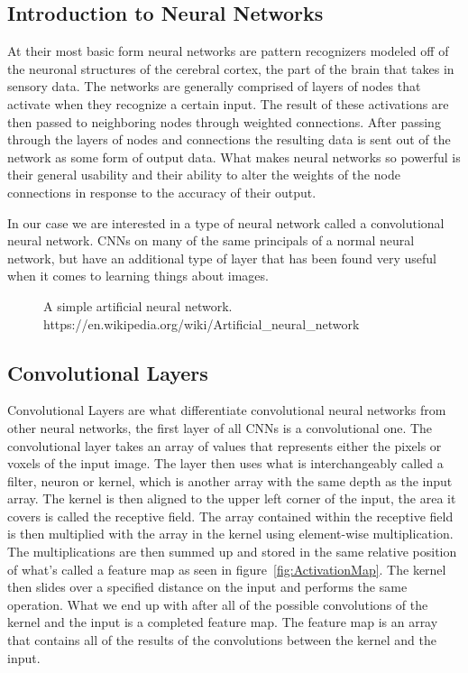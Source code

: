 \documentclass{sig-alternate}
\begin{document}
\subsection{Introduction to Neural Networks}
\label{sec:introNeuralNetworks}

At their most basic form neural networks are pattern recognizers modeled off of the neuronal structures of the cerebral cortex, the part of the brain that takes in sensory data. The networks are generally comprised of layers of nodes that activate when they recognize a certain input. The result of these activations are then passed to neighboring nodes through weighted connections. After passing   through the layers of nodes and connections the resulting data is sent out of the network as some form of output data. What makes neural networks so powerful is their general usability and their ability to alter the weights of the node connections in response to the accuracy of their output.

In our case we are interested in a type of neural network called a convolutional neural network. CNNs on many of the same principals of a normal neural network, but have an additional type of layer that has been found very useful when it comes to learning things about images.

\begin{figure}
\centering
{}
\caption{A simple artificial neural network. https://en.wikipedia.org/wiki/Artificial\_neural\_network}
\label{fig:ANN}
\end{figure}

\subsection{Convolutional Layers}
\label{sec:convolutionalLayers}

Convolutional Layers are what differentiate convolutional neural networks from other neural networks, the first layer of all CNNs is a convolutional one. The convolutional layer takes an array of values that represents either the pixels or voxels of the input image. The layer then uses what is interchangeably called a filter, neuron or kernel, which is another array with the same depth as the input array. The kernel is then aligned to the upper left corner of the input, the area it covers is called the receptive field. The array contained within the receptive field is then multiplied with the array in the kernel using element-wise multiplication. The multiplications are then summed up and stored in the same relative position of what's called a feature map as seen in figure~\ref{fig:ActivationMap}. The kernel then slides over a specified distance on the input and performs the same operation. What we end up with after all of the possible convolutions of the kernel and the input is a completed feature map. The feature map is an array that contains all of the results of the convolutions between the kernel and the input.
\end{document}
